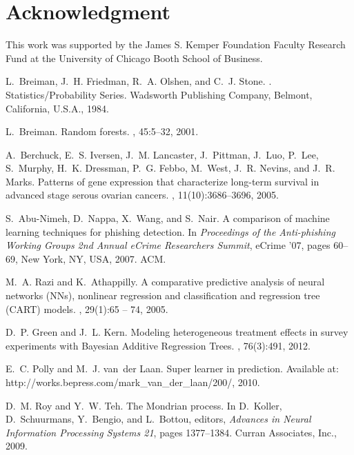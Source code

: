 \documentclass{article}
\newcommand{\1}{\mathbb{I}}
\theoremstyle{assumption}
\begin{document}
 
\section{Acknowledgment}
This work was supported by the James S. Kemper Foundation Faculty Research Fund at the University of Chicago Booth School of Business.

\small

 
\begin{thebibliography}{10}

L.~{Breiman}, J.~H. {Friedman}, R.~A. {Olshen}, and C.~J. {Stone}.
.
\newblock Statistics/Probability Series. Wadsworth Publishing Company, Belmont,
  California, U.S.A., 1984.

L.~Breiman.
\newblock Random forests.
, 45:5--32, 2001.

A.~Berchuck, E.~S. Iversen, J.~M. Lancaster, J.~Pittman, J.~Luo, P.~Lee,
  S.~Murphy, H.~K. Dressman, P.~G. Febbo, M.~West, J.~R. Nevins, and J.~R.
  Marks.
\newblock Patterns of gene expression that characterize long-term survival in
  advanced stage serous ovarian cancers.
, 11(10):3686--3696, 2005.

S.~Abu-Nimeh, D.~Nappa, X.~Wang, and S.~Nair.
\newblock A comparison of machine learning techniques for phishing detection.
\newblock In {\em Proceedings of the Anti-phishing Working Groups 2nd Annual
  eCrime Researchers Summit}, eCrime '07, pages 60--69, New York, NY, USA,
  2007. ACM.

M.~A. Razi and K.~Athappilly.
\newblock A comparative predictive analysis of neural networks ({NN}s),
  nonlinear regression and classification and regression tree ({CART}) models.
, 29(1):65 -- 74, 2005.

D.~P. Green and J.~L. Kern.
\newblock Modeling heterogeneous treatment effects in survey experiments with
  {B}ayesian {A}dditive {R}egression {T}rees.
, 76(3):491, 2012.

E.~C. Polly and M.~J. van~der Laan.
\newblock Super learner in prediction.
\newblock Available at: http://works.bepress.com/mark\_van\_der\_laan/200/,
  2010.

D.~M. Roy and Y.~W. Teh.
\newblock The {M}ondrian process.
\newblock In D.~Koller, D.~Schuurmans, Y.~Bengio, and L.~Bottou, editors, {\em
  Advances in Neural Information Processing Systems 21}, pages 1377--1384.
  Curran Associates, Inc., 2009.


\end{thebibliography}
\end{document}
